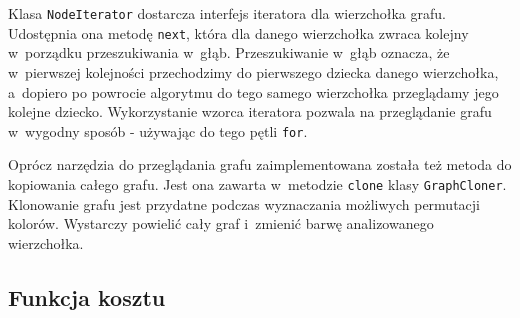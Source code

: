 \documentclass[a4paper,10pt]{article}
\begin{document}
Klasa \verb+NodeIterator+ dostarcza interfejs iteratora dla wierzchołka grafu. Udostępnia ona metodę \verb+next+, która dla danego wierzchołka zwraca kolejny w~porządku przeszukiwania w~głąb. Przeszukiwanie w~głąb oznacza, że w~pierwszej kolejności przechodzimy do pierwszego dziecka danego wierzchołka, a~dopiero po powrocie algorytmu do tego samego wierzchołka przeglądamy jego kolejne dziecko. Wykorzystanie wzorca iteratora pozwala na przeglądanie grafu w~wygodny sposób - używając do tego pętli \verb+for+.

Oprócz narzędzia do przeglądania grafu zaimplementowana została też metoda do kopiowania całego grafu. Jest ona zawarta w~metodzie \verb+clone+ klasy \verb+GraphCloner+. Klonowanie grafu jest przydatne podczas wyznaczania możliwych permutacji kolorów. Wystarczy powielić cały graf i~zmienić barwę analizowanego wierzchołka.

\subsection*{Funkcja kosztu}
\end{document}
